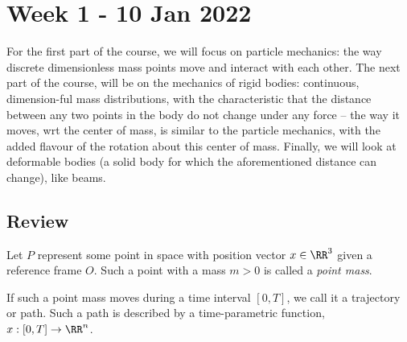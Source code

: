 \section{Week 1 - 10 Jan 2022}
For the first part of the course, we will focus on particle mechanics: the
way discrete dimensionless mass points move and interact with each other. The
next part of the course, will be on the mechanics of rigid bodies: continuous,
dimension-ful mass distributions, with the characteristic that the distance
between any two points in the body do not change under any force -- the way it
moves, wrt the center of mass, is similar to the particle mechanics, with the
added flavour of the rotation about this center of mass. Finally, we will look
at deformable bodies (a solid body for which the aforementioned distance can
change), like beams.

\subsection{Review}
\begin{definition}
  Let $P$ represent some point in space with position vector $x\in\RR^3$ given a
  reference frame $O$. Such a point with a mass $m>0$ is called a \emph{point
  mass}.
  \label{def:pointMass}
\end{definition}

If such a point mass moves during a time interval $[0,T]$, we call it a
trajectory or path. Such a path is described by a time-parametric function,
$x:[0,T]\to\RR^n$. 

